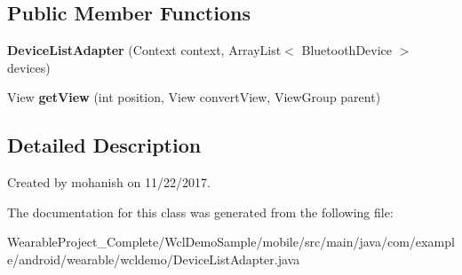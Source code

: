 \subsection*{Public Member Functions}
\begin{DoxyCompactItemize}
\item 
{\bfseries Device\+List\+Adapter} (Context context, Array\+List$<$ Bluetooth\+Device $>$ devices)\hypertarget{classcom_1_1example_1_1android_1_1wearable_1_1wcldemo_1_1DeviceListAdapter_a26e01472f1f1935f103ef8d027c97136}{}\label{classcom_1_1example_1_1android_1_1wearable_1_1wcldemo_1_1DeviceListAdapter_a26e01472f1f1935f103ef8d027c97136}

\item 
View {\bfseries get\+View} (int position, View convert\+View, View\+Group parent)\hypertarget{classcom_1_1example_1_1android_1_1wearable_1_1wcldemo_1_1DeviceListAdapter_ac21221e3ea6f73588e2505d3b2ecc42e}{}\label{classcom_1_1example_1_1android_1_1wearable_1_1wcldemo_1_1DeviceListAdapter_ac21221e3ea6f73588e2505d3b2ecc42e}

\end{DoxyCompactItemize}


\subsection{Detailed Description}
Created by mohanish on 11/22/2017. 

The documentation for this class was generated from the following file\+:\begin{DoxyCompactItemize}
\item 
Wearable\+Project\+\_\+\+Complete/\+Wcl\+Demo\+Sample/mobile/src/main/java/com/example/android/wearable/wcldemo/Device\+List\+Adapter.\+java\end{DoxyCompactItemize}
